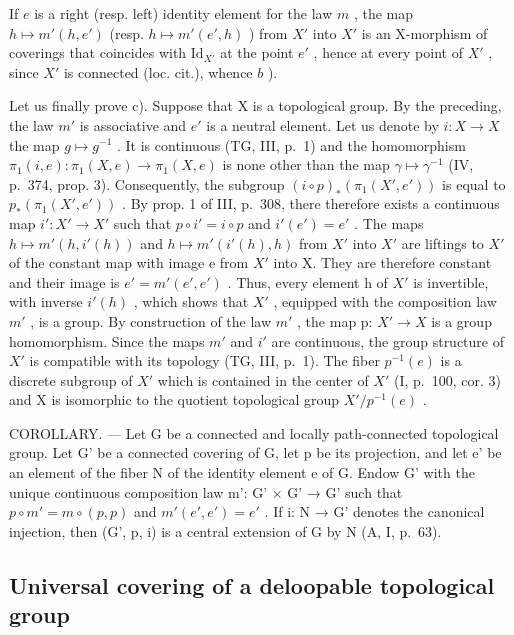 If \(e\) is a right (resp. left) identity element for the law \(m\) , the map \(h \mapsto m'(h, e')\) (resp. \(h \mapsto m'(e', h)\) ) from \(X'\) into \(X'\) is an X-morphism of coverings that coincides with \(\text{Id}_{X'}\) at the point \(e'\) , hence at every point of \(X'\) , since \(X'\) is connected (loc. cit.), whence \(b\) ).

Let us finally prove c). Suppose that X is a topological group. By the preceding, the law \(m'\) is associative and \(e'\) is a neutral element. Let us denote by \(i: X \to X\) the map \(g \mapsto g^{-1}\) . It is continuous (TG, III, p.~1) and the homomorphism \(\pi_{1}(i,e): \pi_{1}(X,e) \to \pi_{1}(X,e)\) is none other than the map \(\gamma \mapsto \gamma^{-1}\) (IV, p.~374, prop. 3). Consequently, the subgroup \((i \circ p)_{*}(\pi_{1}(X',e'))\) is equal to \(p_{*}(\pi_{1}(X',e'))\) . By prop. 1 of III, p.~308, there therefore exists a continuous map \(i': X' \to X'\) such that \(p \circ i' = i \circ p\) and \(i'(e') = e'\) . The maps \(h \mapsto m'(h,i'(h))\) and \(h \mapsto m'(i'(h),h)\) from \(X'\) into \(X'\) are liftings to \(X'\) of the constant map with image e from \(X'\) into X. They are therefore constant and their image is \(e' = m'(e',e')\) . Thus, every element h of \(X'\) is invertible, with inverse \(i'(h)\) , which shows that \(X'\) , equipped with the composition law \(m'\) , is a group. By construction of the law \(m'\) , the map p: \(X' \to X\) is a group homomorphism. Since the maps \(m'\) and \(i'\) are continuous, the group structure of \(X'\) is compatible with its topology (TG, III, p.~1). The fiber \(p^{-1}(e)\) is a discrete subgroup of \(X'\) which is contained in the center of \(X'\) (I, p.~100, cor. 3) and X is isomorphic to the quotient topological group \(X'/p^{-1}(e)\) .

COROLLARY. --- Let G be a connected and locally path-connected topological group. Let G' be a connected covering of G, let p be its projection, and let e' be an element of the fiber N of the identity element e of G. Endow G' with the unique continuous composition law m': G' × G' → G' such that \(p \circ m' = m \circ (p, p)\) and \(m'(e', e') = e'\) . If i: N → G' denotes the canonical injection, then (G', p, i) is a central extension of G by N (A, I, p.~63).

\subsection{Universal covering of a deloopable topological group}

